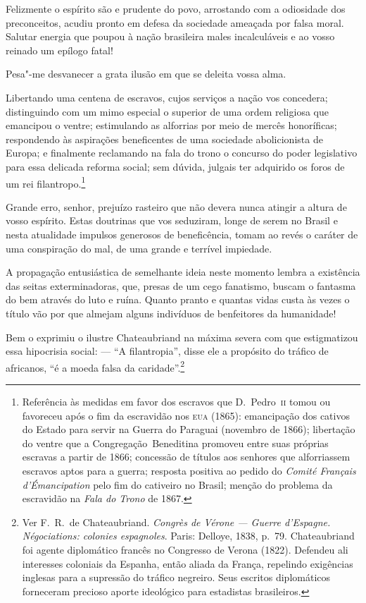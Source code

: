 Felizmente o espírito são e prudente do povo, arrostando com a
odiosidade dos preconceitos, acudiu pronto em defesa da sociedade
ameaçada por falsa moral. Salutar energia que poupou à nação brasileira
males incalculáveis e ao vosso reinado um epílogo fatal! 

Pesa"-me desvanecer a grata ilusão em que se deleita vossa alma. 

Libertando uma centena de escravos, cujos serviços a nação vos
concedera; distinguindo com um mimo especial o superior de uma ordem
religiosa que emancipou o ventre; estimulando as alforrias por meio de
mercês honoríficas; respondendo às aspirações beneficentes de uma \EP[-1]%
sociedade abolicionista de Europa; e finalmente reclamando na fala do
trono o concurso do poder legislativo para essa delicada reforma  
social; sem dúvida, julgais ter adquirido os foros de um rei
filantropo.\footnote{ Referência às medidas em favor dos escravos que D.~Pedro~\textsc{ii} 
tomou ou favoreceu após o fim da escravidão nos \textsc{eua} (1865): emancipação dos cativos 
do Estado para servir na Guerra do Paraguai (novembro de 1866); libertação do ventre que a 
\mbox{Congregação Beneditina} promoveu entre suas próprias escravas a partir de 1866; concessão de 
títulos aos senhores que alforriassem escravos aptos para a guerra; resposta positiva ao 
pedido do \textit{Comité Français d'Émancipation} pelo fim do cativeiro no Brasil; 
menção do problema da escravidão na \textit{Fala do Trono} de 1867.} 
 
Grande erro, senhor, prejuízo rasteiro que não devera nunca atingir a 
altura de vosso espírito. Estas doutrinas que vos seduziram, longe de
serem no Brasil e nesta atualidade impulsos generosos de beneficência,
tomam ao revés o caráter de uma conspiração do mal, de uma grande e
terrível impiedade.

A propagação entusiástica de semelhante ideia neste momento lembra a
existência das seitas exterminadoras, que, presas de um cego fanatismo,
buscam o fantasma do bem através do luto e ruína. Quanto pranto e
quantas vidas custa às vezes o título vão por que almejam alguns
indivíduos de benfeitores da humanidade!

Bem o exprimiu o ilustre Chateaubriand na máxima severa com que
estigmatizou essa hipocrisia social: --- ``A filantropia'', disse ele a
propósito do tráfico de africanos, ``é a moeda falsa da
caridade''.\footnote{ Ver F.~R.~de Chateaubriand. \textit{Congrès de Vérone --- 
Guerre d'Espagne. Négociations: colonies espagnoles}. Paris: Delloye, 1838, p.~79. 
Chateaubriand foi agente diplomático francês no Congresso 
de Verona (1822). Defendeu ali interesses coloniais da Espanha, então aliada da França, 
repelindo exigências inglesas para a supressão do tráfico negreiro. Seus escritos 
diplomáticos forneceram precioso aporte ideológico para estadistas brasileiros.}

